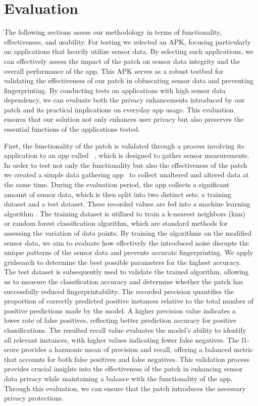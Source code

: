 \documentclass[11pt,
  oneside,openany,    %
]{scrreprt}
\begin{document}
\chapter{Evaluation}
\label{chap:evaluation}
The following sections assess our methodology in terms of functionality, effectiveness, and usability. 
For testing we selected an APK, focusing particularly on applications that heavily utilize sensor data.
By selecting such applications, we can effectively assess the impact of the patch on sensor data integrity and the overall performance of the app.
This APK serves as a robust testbed for validating the effectiveness of our patch in obfuscating sensor data and preventing fingerprinting.
By conducting tests on applications with high sensor data dependency, we can evaluate both the privacy enhancements introduced by our patch and its practical implications on everyday app usage.
This evaluation ensures that our solution not only enhances user privacy but also preserves the essential functions of the applications tested.

First, the functionality of the patch is validated through a process involving its application to an app called ~\cite{SensorBox}, which is designed to gather sensor measurements.
In order to test not only the functionality but also the effectiveness of the patch we created a simple data gathering app~\cite{sensorprint} to collect unaltered and altered data at the same time. 
During the evaluation period, the app collects a significant amount of sensor data, which is then split into two distinct sets: a training dataset and a test dataset.
These recorded values are fed into a machine learning algorithm \cite{DBLP:journals/tifs/AmeriniBCMN17}.
The training dataset is utilized to train a k-nearest neighbors (knn) or random forest classification algorithm, which are standard methods for assessing the variation of data points.
By training the algorithms on the modified sensor data, we aim to evaluate how effectively the introduced noise disrupts the unique patterns of the sensor data and prevents accurate fingerprinting.
We apply gridsearch to determine the best possible parameters for the highest accuracy.
The test dataset is subsequently used to validate the trained algorithm, allowing us to measure the classification accuracy and determine whether the patch has successfully reduced fingerprintability.
The recorded precision quantifies the proportion of correctly predicted positive instances relative to the total number of positive predictions made by the model.
A higher precision value indicates a lower rate of false positives, reflecting better prediction accuracy for positive classifications.
The resulted recall value evaluates the model's ability to identify all relevant instances, with higher values indicating fewer false negatives.
The f1-score provides a harmonic mean of precision and recall, offering a balanced metric that accounts for both false positives and false negatives.
This validation process provides crucial insights into the effectiveness of the patch in enhancing sensor data privacy while maintaining a balance with the functionality of the app.
Through this evaluation, we can ensure that the patch introduces the necessary privacy protections.
\end{document}
